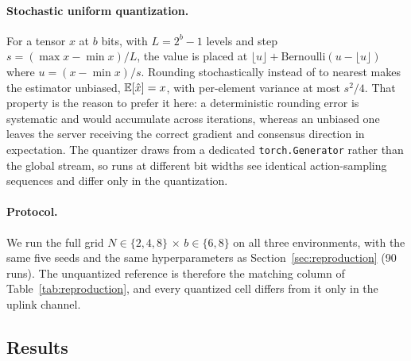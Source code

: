 \paragraph{Stochastic uniform quantization.} For a tensor $x$ at $b$ bits, with
$L = 2^b - 1$ levels and step $s = (\max x - \min x)/L$, the value is placed at
$\lfloor u \rfloor + \mathrm{Bernoulli}(u - \lfloor u \rfloor)$ where
$u = (x - \min x)/s$. Rounding stochastically instead of to nearest makes the
estimator unbiased, $\mathbb{E}[\hat{x}] = x$, with per-element variance at most
$s^2/4$. That property is the reason to prefer it here: a deterministic
rounding error is systematic and would accumulate across iterations, whereas an
unbiased one leaves the server receiving the correct gradient and consensus
direction in expectation. The quantizer draws from a dedicated
\texttt{torch.Generator} rather than the global stream, so runs at different
bit widths see identical action-sampling sequences and differ only in the
quantization.

\paragraph{Protocol.} We run the full grid $N \in \{2, 4, 8\}$ $\times$
$b \in \{6, 8\}$ on all three environments, with the same five seeds and the
same hyperparameters as Section~\ref{sec:reproduction} (90 runs). The
unquantized reference is therefore the matching column of
Table~\ref{tab:reproduction}, and every quantized cell differs from it only in
the uplink channel.

\subsection{Results}

